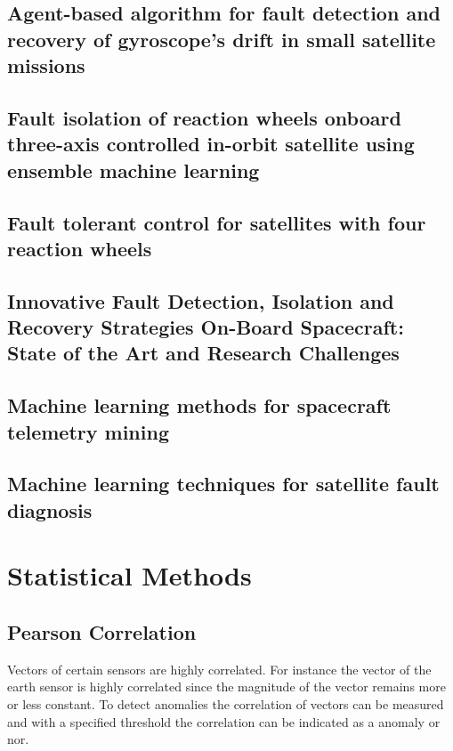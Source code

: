 \subsection{Agent-based algorithm for fault detection and recovery of gyroscope's drift in small satellite missions}
\cite{carvajal2017agent}

\subsection{Fault isolation of reaction wheels onboard three-axis controlled in-orbit satellite using ensemble machine learning}
\cite{rahimi2020fault}

\subsection{Fault tolerant control for satellites with four reaction wheels}
\cite{jin2008fault}

\subsection{Innovative Fault Detection, Isolation and Recovery Strategies On-Board Spacecraft: State of the Art and Research Challenges}
\cite{wander2013innovative}

\subsection{Machine learning methods for spacecraft telemetry mining}
\cite{ibrahim2018machine}

\subsection{Machine learning techniques for satellite fault diagnosis}
\cite{ibrahim2020machine}

\section{Statistical Methods}
\subsection{Pearson Correlation}
Vectors of certain sensors are highly correlated. For instance the vector of the earth sensor is highly correlated since the magnitude of the vector remains more or less constant. To detect anomalies the correlation of vectors can be measured and with a specified threshold the correlation can be indicated as a anomaly or nor.

